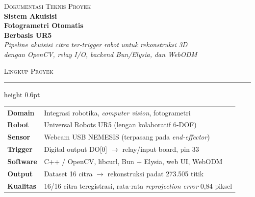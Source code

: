 \documentclass[11pt,a4paper]{article}
\begin{document}
\begin{titlepage}
    \thispagestyle{empty}

    \vspace*{2.5cm}
    \begin{flushleft}
        {\color{white!85!black}\fontsize{11}{13}\selectfont\textsc{Dokumentasi Teknis Proyek}}\\[14pt]
        {\color{white}\fontsize{30}{36}\selectfont\bfseries Sistem Akuisisi}\\[6pt]
        {\color{white}\fontsize{30}{36}\selectfont\bfseries Fotogrametri Otomatis}\\[6pt]
        {\color{white}\fontsize{30}{36}\selectfont\bfseries Berbasis UR5}\\[22pt]
        {\color{accentLight}\fontsize{13}{17}\selectfont\itshape
        Pipeline akuisisi citra ter-trigger robot untuk rekonstruksi 3D\\
        dengan OpenCV, relay I/O, backend Bun/Elysia, dan WebODM}
    \end{flushleft}

    \vspace{2.2cm}

    \begin{flushleft}
        {\color{accent}\textsc{\small Lingkup Proyek}}\\[6pt]
        {\color{rule}\hrule height 0.6pt}\vspace{6pt}
        \begin{tabularx}{\linewidth}{@{}p{2.4cm}X@{}}
            \textbf{Domain}     & Integrasi robotika, \textit{computer vision}, fotogrametri \\[2pt]
            \textbf{Robot}      & Universal Robots UR5 (lengan kolaboratif 6-DOF) \\[2pt]
            \textbf{Sensor}     & Webcam USB NEMESIS (terpasang pada \textit{end-effector}) \\[2pt]
            \textbf{Trigger}    & Digital output DO[0] $\rightarrow$ relay/input board, pin 33 \\[2pt]
            \textbf{Software}   & C++ / OpenCV, libcurl, Bun + Elysia, web UI, WebODM \\[2pt]
            \textbf{Output}     & Dataset 16 citra $\rightarrow$ rekonstruksi padat 273{.}505 titik \\[2pt]
            \textbf{Kualitas}   & 16/16 citra teregistrasi, rata-rata \textit{reprojection error} 0{,}84 piksel \\
        \end{tabularx}
    \end{flushleft}


\end{titlepage}
\end{document}
